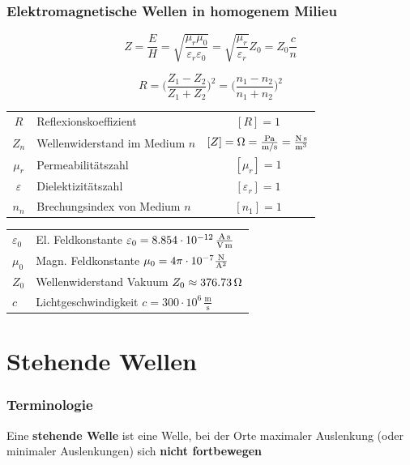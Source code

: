 \subsubsection{Elektromagnetische Wellen in homogenem Milieu}

$$ \boxed{ Z = \frac{E}{H} = \sqrt{ \frac{\mu_r \mu_0}{\varepsilon_r \varepsilon_0}} = \sqrt{\frac{\mu_r}{\varepsilon_r}} Z_0 = Z_0 \frac{c}{n}} $$


$$ \boxed{ R = \Big(  \frac{Z_1 - Z_2}{Z_1 + Z_2}  \Big)^2 =  \Big(  \frac{n_1 - n_2}{n_1 + n_2}  \Big)^2 }  $$

\renewcommand{\arraystretch}{1.1}
\begin{tabular}{clc}
$R$ & Reflexionskoeffizient  & $[R] = 1$ \\
$Z_n$ & Wellenwiderstand im Medium $n$ & $[Z] = \mathrm{\Omega} = \frac{\mathrm{Pa}}{\mathrm{m} / \mathrm{s}} = \frac{\mathrm{N} \, \mathrm{s}}{\mathrm{m}^3}$ \\
$\mu_r$ & Permeabilitätszahl & $[\mu_r] = 1$ \\
$\varepsilon$ & Dielektizitätszahl & $[\varepsilon_r] = 1$ \\
$n_n$ & Brechungsindex von Medium $n$ & $[n_1] = 1$ \\
\end{tabular}


\renewcommand{\arraystretch}{1.2}
\begin{tabular}{ll}
$\varepsilon_0$ & El. Feldkonstante $\varepsilon_0 = 8.854 \cdot 10^{-12} \, \frac{\mathrm{A} \, \mathrm{s}}{\mathrm{V} \, \mathrm{m}}$ \\
$\mu_0$ & Magn. Feldkonstante $\mu_0 = 4 \pi \cdot 10^{-7} \frac{\mathrm{N}}{\mathrm{A}^2}$\\
$Z_0$ & Wellenwiderstand Vakuum $Z_0 \approx 376.73 \, \mathrm{\Omega}$ \\
$c$ & Lichtgeschwindigkeit $c = 300 \cdot 10^6 \, \mathrm{\frac{m}{s}}$ \\ 
\end{tabular}
\renewcommand{\arraystretch}{1}





\section{Stehende Wellen}

\subsubsection{Terminologie}

Eine \textbf{stehende Welle} ist eine Welle, bei der Orte maximaler Auslenkung (oder minimaler Auslenkungen) sich
\textbf{nicht fortbewegen} 


